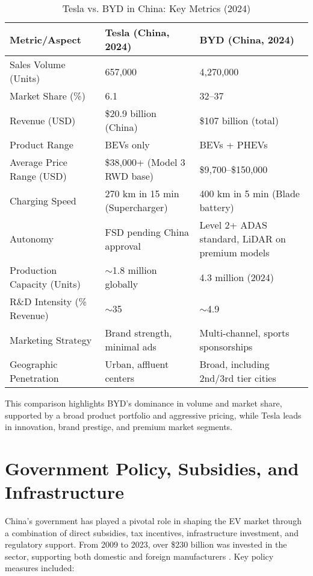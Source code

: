 \documentclass{article}
\begin{document}
\begin{table}[ht]
\centering
\caption{Tesla vs. BYD in China: Key Metrics (2024)}
\label{tab:comparison}
\begin{tabularx}{\textwidth}{l X X}
\toprule
Metric/Aspect & Tesla (China, 2024) & BYD (China, 2024) \\
\midrule
Sales Volume (Units) & 657,000 & 4,270,000 \\
Market Share (\%) & 6.1 & 32--37 \\
Revenue (USD) & \$20.9 billion (China) & \$107 billion (total) \\
Product Range & BEVs only & BEVs + PHEVs \\
Average Price Range (USD) & \$38,000+ (Model 3 RWD base) & \$9,700--\$150,000 \\
Charging Speed & 270 km in 15 min (Supercharger) & 400 km in 5 min (Blade battery) \\
Autonomy & FSD pending China approval & Level 2+ ADAS standard, LiDAR on premium models \\
Production Capacity (Units) & $\sim$1.8 million globally & 4.3 million (2024) \\
R\&D Intensity (\% Revenue) & $\sim$35 & $\sim$4.9 \\
Marketing Strategy & Brand strength, minimal ads & Multi-channel, sports sponsorships \\
Geographic Penetration & Urban, affluent centers & Broad, including 2nd/3rd tier cities \\
\bottomrule
\end{tabularx}
\end{table}

This comparison highlights BYD's dominance in volume and market share, supported by a broad product portfolio and aggressive pricing, while Tesla leads in innovation, brand prestige, and premium market segments.

\section{Government Policy, Subsidies, and Infrastructure}

China's government has played a pivotal role in shaping the EV market through a combination of direct subsidies, tax incentives, infrastructure investment, and regulatory support. From 2009 to 2023, over \$230 billion was invested in the sector, supporting both domestic and foreign manufacturers \citep{csis2024,techreview2023}. Key policy measures included:
\end{document}
